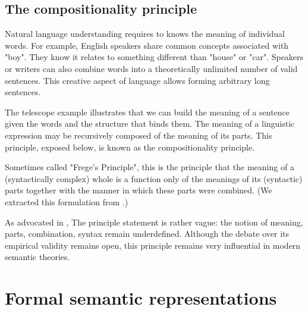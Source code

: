 \subsection{The compositionality principle}

Natural language understanding requires to knows the meaning of individual words. For example, English speakers share common concepts associated with "boy". They know it relates to something different than "house" or "car". Speakers or writers can also combine words into a theoretically unlimited number of valid sentences. This creative aspect of language allows forming arbitrary long sentences. 

The telescope example illustrates that we can build the meaning of a sentence given the words and the structure that binds them. The meaning of a linguistic expression may be recursively composed of the meaning of its parts. This principle, exposed below, is known as the compositionality principle.

\begin{kaobox}[frametitle=The principle of semantic compositionality]
Sometimes called "Frege's Principle", this is the principle that the meaning of a (syntactically complex) whole is a function only of the meanings of its (syntactic) parts together with the manner in which these parts were combined. (We extracted this formulation from \textcite{pelletier_94}.)
\end{kaobox}

As advocated in \textcite{pelletier_94}, The principle statement is rather vague: the notion of meaning, parts, combination, syntax remain underdefined. Although the debate over its empirical validity remains open, this principle remains very influential in modern semantic theories. 

\section{Formal semantic representations}


